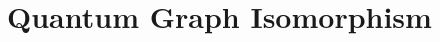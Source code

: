 \documentclass[12pt]{article}
\theoremstyle{definition}
\begin{document}
\section{Quantum Graph Isomorphism}

\newpage



\end{document}
